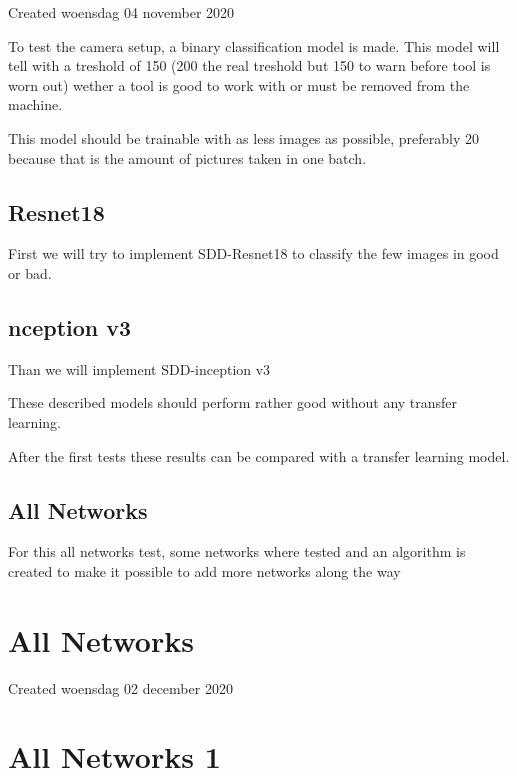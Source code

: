 Created woensdag 04 november 2020



To test the camera setup, a binary classification model is made. This model will tell with a treshold of 150 (200 the real treshold but 150 to warn before tool is worn out) wether a tool is good to work with or must be removed from the machine. 

This model should be trainable with as less images as possible, preferably 20 because that is the amount of pictures taken in one batch.





\subsection{Resnet18}

First we will try to implement SDD-Resnet18 to classify the few images in good or bad. 



\subsection{nception v3}

Than we will implement SDD-inception v3 



These described models should perform rather good without any transfer learning. 

After the first tests these results can be compared with a transfer learning model.





\subsection{All Networks}

For this all networks test, some networks where tested and an algorithm is created to make it possible to add more networks along the way


		\section{All Networks}

Created woensdag 02 december 2020




		\section{All Networks 1}


